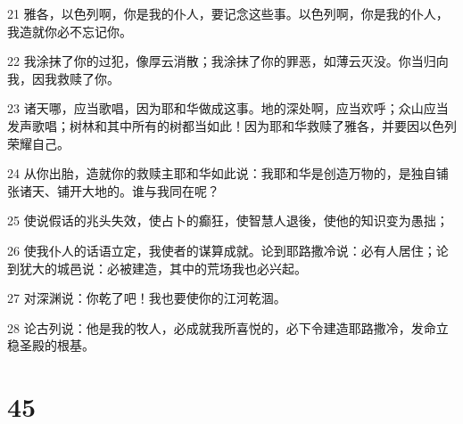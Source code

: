 \par 21 雅各，以色列啊，你是我的仆人，要记念这些事。以色列啊，你是我的仆人，我造就你必不忘记你。
\par 22 我涂抹了你的过犯，像厚云消散；我涂抹了你的罪恶，如薄云灭没。你当归向我，因我救赎了你。
\par 23 诸天哪，应当歌唱，因为耶和华做成这事。地的深处啊，应当欢呼；众山应当发声歌唱；树林和其中所有的树都当如此！因为耶和华救赎了雅各，并要因以色列荣耀自己。
\par 24 从你出胎，造就你的救赎主耶和华如此说：我耶和华是创造万物的，是独自铺张诸天、铺开大地的。谁与我同在呢？
\par 25 使说假话的兆头失效，使占卜的癫狂，使智慧人退後，使他的知识变为愚拙；
\par 26 使我仆人的话语立定，我使者的谋算成就。论到耶路撒冷说：必有人居住；论到犹大的城邑说：必被建造，其中的荒场我也必兴起。
\par 27 对深渊说：你乾了吧！我也要使你的江河乾涸。
\par 28 论古列说：他是我的牧人，必成就我所喜悦的，必下令建造耶路撒冷，发命立稳圣殿的根基。

\chapter{45}

